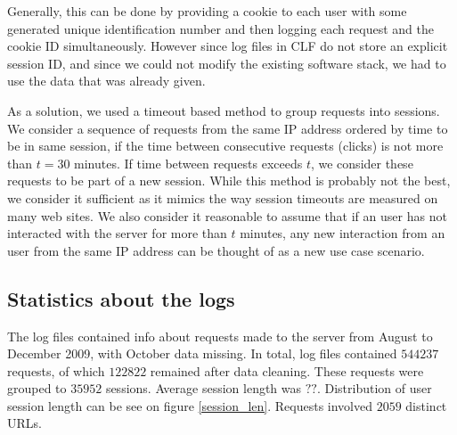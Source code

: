 \documentclass[english,a4paper]{article}
\begin{document}
Generally, this can be done by providing a cookie to each user with some generated unique identification number and then logging each request and the cookie ID simultaneously. However since log files in CLF do not store an explicit session ID, and since we could not modify the existing software stack, we had to use the data that was already given.  

As a solution, we used a timeout based method to group requests into sessions. We consider a sequence of requests from the same IP address ordered by time to be in
same session, if the time between consecutive requests (clicks) is not more
than $t = 30$ minutes. If time between requests exceeds $t$, we
consider these requests to be part of a new session. While this method is
probably not the best, we consider it sufficient as it mimics the way session
timeouts are measured on many web sites. We also consider it reasonable to
assume that if an user has not interacted with the server for more than $t$
minutes, any new interaction from an user from the same IP address can be
thought of as a new use case scenario.










\subsection{Statistics about the logs} 
The log files contained info about requests made to the server from August to December 2009, with October data missing. In total, log files contained 
$544237$ requests, of which $122822$ remained after data cleaning. These requests were grouped to $35952$ sessions. Average session length was $??$. Distribution of user session length can be see on figure \ref{session_len}. Requests involved $2059$ distinct URLs. 
\end{document}

